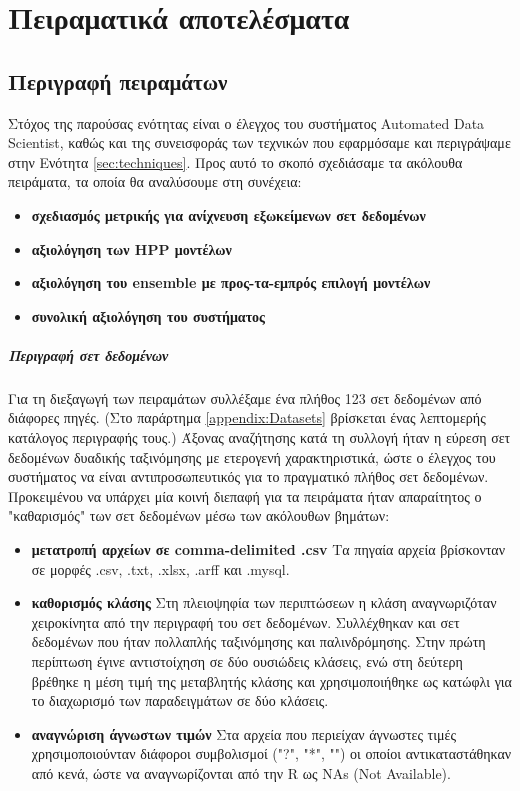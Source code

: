 \chapter{Πειραματικά αποτελέσματα}
\section{Περιγραφή πειραμάτων}
Στόχος της παρούσας ενότητας είναι ο έλεγχος του συστήματος Automated Data Scientist, καθώς και της συνεισφοράς των τεχνικών που εφαρμόσαμε και περιγράψαμε στην Ενότητα \ref{sec:techniques}. Προς αυτό το σκοπό σχεδιάσαμε τα ακόλουθα πειράματα, τα οποία θα αναλύσουμε στη συνέχεια:
\begin{itemize}
	\item \textbf{σχεδιασμός μετρικής για ανίχνευση εξωκείμενων σετ δεδομένων}
	\item \textbf{αξιολόγηση των HPP μοντέλων}
	\item \textbf{αξιολόγηση του ensemble με προς-τα-εμπρός επιλογή μοντέλων}
	\item \textbf{συνολική αξιολόγηση του συστήματος}
\end{itemize}

\paragraph{Περιγραφή σετ δεδομένων} Για τη διεξαγωγή των πειραμάτων συλλέξαμε ένα πλήθος 123 σετ δεδομένων από διάφορες πηγές. (Στο παράρτημα \ref{appendix:Datasets} βρίσκεται ένας λεπτομερής κατάλογος περιγραφής τους.) Άξονας αναζήτησης κατά τη συλλογή ήταν η εύρεση σετ δεδομένων δυαδικής ταξινόμησης με ετερογενή χαρακτηριστικά, ώστε ο έλεγχος του συστήματος να είναι αντιπροσωπευτικός για το πραγματικό πλήθος σετ δεδομένων. Προκειμένου να υπάρχει μία κοινή διεπαφή για τα πειράματα ήταν απαραίτητος ο "καθαρισμός" των σετ δεδομένων μέσω των ακόλουθων βημάτων:
\begin{itemize}
	\item \textbf{μετατροπή αρχείων σε comma-delimited .csv} Τα πηγαία αρχεία βρίσκονταν σε μορφές .csv, .txt, .xlsx, .arff και .mysql.
	\item \textbf{καθορισμός κλάσης} Στη πλειοψηφία των περιπτώσεων η κλάση αναγνωριζόταν χειροκίνητα από την περιγραφή του σετ δεδομένων. Συλλέχθηκαν και σετ δεδομένων που ήταν πολλαπλής ταξινόμησης και παλινδρόμησης. Στην πρώτη περίπτωση έγινε αντιστοίχηση σε δύο ουσιώδεις κλάσεις, ενώ στη δεύτερη βρέθηκε η μέση τιμή της μεταβλητής κλάσης και χρησιμοποιήθηκε ως κατώφλι για το διαχωρισμό των παραδειγμάτων σε δύο κλάσεις.
	\item \textbf{αναγνώριση άγνωστων τιμών} Στα αρχεία που περιείχαν άγνωστες τιμές χρησιμοποιούνταν διάφοροι συμβολισμοί ("?", "*", "") οι οποίοι αντικαταστάθηκαν από κενά, ώστε να αναγνωρίζονται από την R ως NAs (Not Available).  
\end{itemize}
